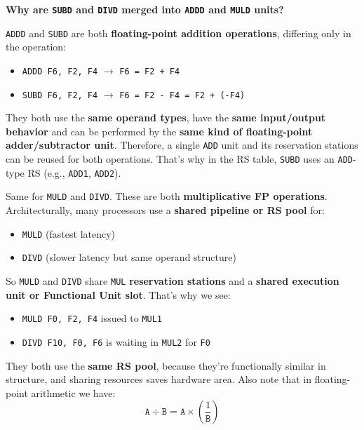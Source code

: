 \highspace
\begin{flushleft}
    \textcolor{Green3}{ \textbf{Why are \texttt{SUBD} and \texttt{DIVD} merged into \texttt{ADDD} and \texttt{MULD} units?}}
\end{flushleft}
\texttt{ADDD} and \texttt{SUBD} are both \textbf{floating-point addition operations}, differing only in the operation:
\begin{itemize}
    \item \texttt{ADDD F6, F2, F4} $\rightarrow$ \texttt{F6 = F2 + F4}
    \item \texttt{SUBD F6, F2, F4} $\rightarrow$ \texttt{F6 = F2 - F4 = F2 + (-F4)}
\end{itemize}
They both use the \textbf{same operand types}, have the \textbf{same input/output behavior} and can be performed by the \textbf{same kind of floating-point adder/subtractor unit}. Therefore, a single \texttt{ADD} unit and its reservation stations can be reused for both operations. That's why in the RS table, \texttt{SUBD} uses an \texttt{ADD}-type RS (e.g., \texttt{ADD1}, \texttt{ADD2}).

\highspace
Same for \texttt{MULD} and \texttt{DIVD}. These are both \textbf{multiplicative FP operations}. Architecturally, many processors use a \textbf{shared pipeline or RS pool} for:
\begin{itemize}
    \item \texttt{MULD} (fastest latency)
    \item \texttt{DIVD} (slower latency but same operand structure)
\end{itemize}
So \texttt{MULD} and \texttt{DIVD} share \texttt{MUL} \textbf{reservation stations} and a \textbf{shared execution unit or Functional Unit slot}. That's why we see:
\begin{itemize}
    \item \texttt{MULD F0, F2, F4} issued to \texttt{MUL1}
    \item \texttt{DIVD F10, F0, F6} is waiting in \texttt{MUL2} for \texttt{F0}
\end{itemize}
They both use the \textbf{same RS pool}, because they're functionally similar in structure, and sharing resources saves hardware area. Also note that in floating-point arithmetic we have:
\begin{equation*}
    \texttt{A} \div \texttt{B} = \texttt{A} \times \left(\dfrac{1}{\texttt{B}}\right)
\end{equation*}

\newpage

